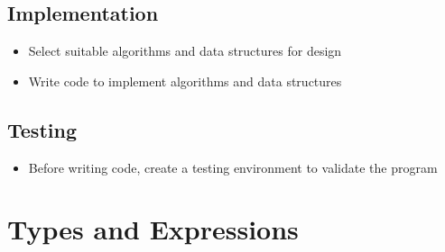 \documentclass{article}
\begin{document}
\subsection{Implementation}
\begin{itemize}
    \item Select suitable algorithms and data structures for design
    \item Write code to implement algorithms and data structures
\end{itemize}
\subsection{Testing}
\begin{itemize}
    \item Before writing code, create a testing environment to validate
          the program
\end{itemize}
\section{Types and Expressions}
\end{document}
